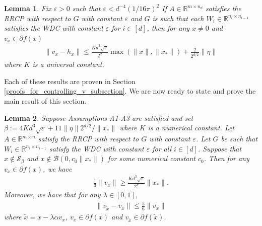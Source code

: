 \documentclass[11pt]{article}
\renewcommand{\epsilon}{\varepsilon}
\newcommand{\R}{\mathbb{R}}
\newcommand{\al}{\alpha}
\newcommand{\Seps}{\mathcal{S}}
\newcommand{\G}{G}
\newtheorem{lem}{Lemma}
\theoremstyle{remark}
\begin{document}
\begin{lem} \label{conc_v_to_h}
Fix $\epsilon > 0$ such that $\epsilon < d^{-4}(1/16\pi)^2$ If $A \in \R^{m \times n_d}$ satisfies the RRCP with respect to $\G$ with constant $\epsilon$ and $\G$ is such that each $W_i \in \R^{n_i \times n_{i-1}}$ satisfies the WDC with constant $\epsilon$ for $i \in [d]$, then for any $x \neq 0$ and $v_x \in \partial f(x)$ \begin{align*}
\|v_x - h_x\| \leqslant  \frac{Kd^3\sqrt{\epsilon}}{2^d}\max(\|x\|,\|x_*\|) + \frac{2}{2^{d/2}}\|\eta\|
\end{align*} where $K$ is a universal constant. 
\end{lem}
\noindent Each of these results are proven in Section \ref{proofs_for_controlling_v_subsection}. We are now ready to state and prove the main result of this section.

\begin{lem} \label{closeness_of_subgrads} Suppose Assumptions A1-A3 are satisfied and set $\beta:= 4Kd^3\sqrt{\epsilon} + 11\|\eta\|2^{d/2}/\|x_*\|$ where $K$ is a numerical constant. Let $A \in \R^{m \times n}$ satisfy the RRCP with respect to $\G$ with constant $\epsilon$. Let $\G$ be such that $W_{i} \in \R^{n_i \times n_{i-1}}$ satisfy the WDC with constant $\epsilon$ for all $i \in [d]$. Suppose that $x \notin \Seps_{\beta}$ and $x \notin \mathcal{B}(0,c_0\|x_*\|)$ for some numerical constant $c_0$. Then for any $v_x \in \partial f(x)$, we have \begin{align}
    \frac{1}{3}\|v_{x}\| \geqslant \frac{Kd^3\sqrt{\epsilon}}{2^d}\|x_*\|. \label{norm_v_lower_bound}
\end{align} Moreover, we have that for any $\lambda \in [0,1]$, \begin{align}
    \|v_{\tilde{x}} - v_{x}\| \leqslant \frac{5}{6}\|v_{x}\| \label{v_tilde_lipschitz}
\end{align} where $\tilde{x} = x - \lambda\al v_{x}$, $v_{x} \in \partial f(x)$ and $v_{\tilde{x}} \in \partial f(\tilde{x})$.
\end{lem}
\end{document}
